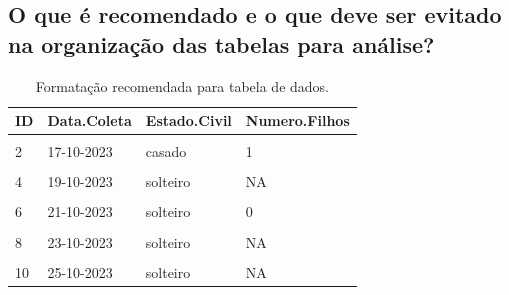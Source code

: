 \documentclass[
  a4paper,
]{book}
\begin{document}
\hypertarget{o-que-uxe9-recomendado-e-o-que-deve-ser-evitado-na-organizauxe7uxe3o-das-tabelas-para-anuxe1lise}{%
\subsection{O que é recomendado e o que deve ser evitado na organização das tabelas para análise?}\label{o-que-uxe9-recomendado-e-o-que-deve-ser-evitado-na-organizauxe7uxe3o-das-tabelas-para-anuxe1lise}}

\begin{table}

\caption{\label{tab:tabela-recomendada}Formatação recomendada para tabela de dados.}
\centering
\begin{tabu} to 
\toprule
\textbf{ID} & \textbf{Data.Coleta} & \textbf{Estado.Civil} & \textbf{Numero.Filhos}\\
\midrule
{} &  &  & \\
2 & 17-10-2023 & casado & 1\\
 &  &  & \\
4 & 19-10-2023 & solteiro & NA\\
 &  &  & \\
6 & 21-10-2023 & solteiro & 0\\
 &  &  & \\
8 & 23-10-2023 & solteiro & NA\\
 &  &  & \\
10 & 25-10-2023 & solteiro & NA\\
\bottomrule
\end{tabu}
\end{table}
\end{document}
